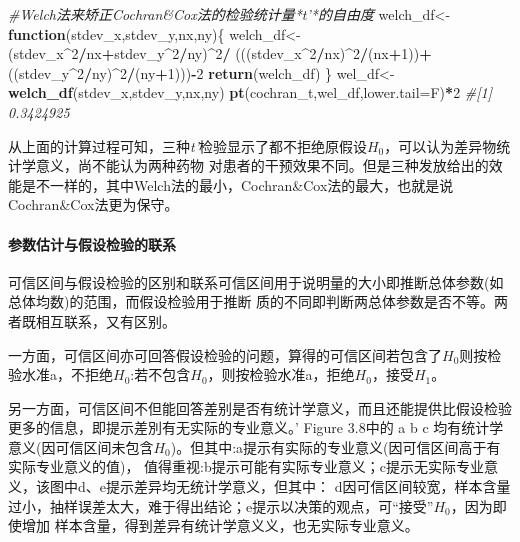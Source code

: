 \documentclass[
]{article}
\newenvironment{Shaded}{\begin{snugshade}}{\end{snugshade}}
\newcommand{\CommentTok}[1]{\textcolor[rgb]{0.56,0.35,0.01}{\textit{#1}}}
\newcommand{\ControlFlowTok}[1]{\textcolor[rgb]{0.13,0.29,0.53}{\textbf{#1}}}
\newcommand{\DataTypeTok}[1]{\textcolor[rgb]{0.13,0.29,0.53}{#1}}
\newcommand{\DecValTok}[1]{\textcolor[rgb]{0.00,0.00,0.81}{#1}}
\newcommand{\KeywordTok}[1]{\textcolor[rgb]{0.13,0.29,0.53}{\textbf{#1}}}
\newcommand{\NormalTok}[1]{#1}
\newcommand{\OperatorTok}[1]{\textcolor[rgb]{0.81,0.36,0.00}{\textbf{#1}}}
\newcommand{\StringTok}[1]{\textcolor[rgb]{0.31,0.60,0.02}{#1}}
\begin{document}
\begin{Shaded}
\begin{Highlighting}[]
\CommentTok{#Welch法来矫正Cochran&Cox法的检验统计量*t'*的自由度}
\NormalTok{welch_df<-}\ControlFlowTok{function}\NormalTok{(stdev_x,stdev_y,nx,ny)\{}
\NormalTok{  welch_df<-(stdev_x}\OperatorTok{^}\DecValTok{2}\OperatorTok{/}\NormalTok{nx}\OperatorTok{+}\NormalTok{stdev_y}\OperatorTok{^}\DecValTok{2}\OperatorTok{/}\NormalTok{ny)}\OperatorTok{^}\DecValTok{2}\OperatorTok{/}
\StringTok{  }\NormalTok{(((stdev_x}\OperatorTok{^}\DecValTok{2}\OperatorTok{/}\NormalTok{nx)}\OperatorTok{^}\DecValTok{2}\OperatorTok{/}\NormalTok{(nx}\OperatorTok{+}\DecValTok{1}\NormalTok{))}\OperatorTok{+}
\StringTok{  }\NormalTok{((stdev_y}\OperatorTok{^}\DecValTok{2}\OperatorTok{/}\NormalTok{ny)}\OperatorTok{^}\DecValTok{2}\OperatorTok{/}\NormalTok{(ny}\OperatorTok{+}\DecValTok{1}\NormalTok{)))}\OperatorTok{-}\DecValTok{2}
  \KeywordTok{return}\NormalTok{(welch_df)}
\NormalTok{\}}
\NormalTok{wel_df<-}\KeywordTok{welch_df}\NormalTok{(stdev_x,stdev_y,nx,ny)}
\KeywordTok{pt}\NormalTok{(cochran_t,wel_df,}\DataTypeTok{lower.tail=}\NormalTok{F)}\OperatorTok{*}\DecValTok{2}
\CommentTok{#[1] 0.3424925}
\end{Highlighting}
\end{Shaded}

从上面的计算过程可知，三种\emph{t'}检验显示了都不拒绝原假设\(H_0\)，可以认为差异物统计学意义，尚不能认为两种药物
对患者的干预效果不同。但是三种发放给出的效能是不一样的，其中Welch法的最小，Cochran\&Cox法的最大，也就是说
Cochran\&Cox法更为保守。

\hypertarget{ux53c2ux6570ux4f30ux8ba1ux4e0eux5047ux8bbeux68c0ux9a8cux7684ux8054ux7cfb}{%
\paragraph{参数估计与假设检验的联系}\label{ux53c2ux6570ux4f30ux8ba1ux4e0eux5047ux8bbeux68c0ux9a8cux7684ux8054ux7cfb}}

可信区间与假设检验的区别和联系可信区间用于说明量的大小即推断总体参数(如总体均数)的范围，而假设检验用于推断
质的不同即判断两总体参数是否不等。两者既相互联系，又有区别。

一方面，可信区间亦可回答假设检验的问题，算得的可信区间若包含了\(H_0\)则按检验水准a，不拒绝\(H_0\):若不包含\(H_0\)，则按检验水准a，拒绝\(H_0\)，接受\(H_1\)。

另一方面，可信区间不但能回答差别是否有统计学意义，而且还能提供比假设检验更多的信息，即提示差別有无实际的专业意义。'
Figure 3.8中的 a b c 均有统计学意义(因可信区间未包含\(H_0\))。但其中:a提示有实际的专业意义(因可信区间高于有实际专业意义的值)，
值得重视:b提示可能有实际专业意义；c提示无实际专业意义，该图中d、e提示差异均无统计学意义，但其中：
d因可信区间较宽，样本含量过小，抽样误差太大，难于得出结论；e提示以决策的观点，可``接受''\(H_0\)，因为即使增加
样本含量，得到差异有统计学意义义，也无实际专业意义。
\end{document}
